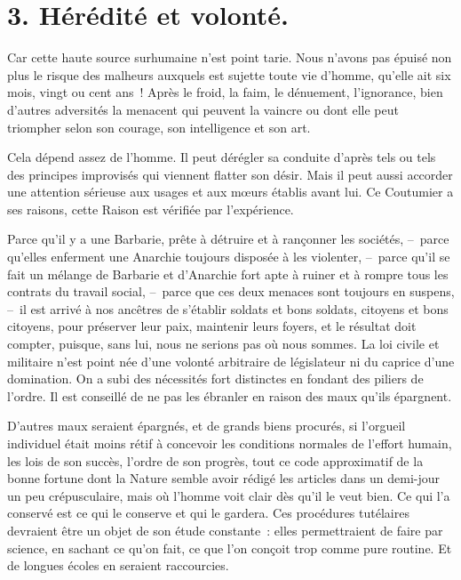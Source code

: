 \documentclass[french,twoside]{book} %
\begin{document}
\section[{3. Hérédité et volonté.}]{3. Hérédité et volonté.}
\noindent Car cette haute source surhumaine n’est point tarie. Nous n’avons pas épuisé non plus le risque des malheurs auxquels est sujette toute vie d’homme, qu’elle ait six mois, vingt ou cent ans ! Après le froid, la faim, le dénuement, l’ignorance, bien d’autres adversités la menacent qui peuvent la vaincre ou dont elle peut triompher selon son courage, son intelligence et son art.\par
Cela dépend assez de l’homme. Il peut dérégler sa conduite d’après tels ou tels des principes improvisés qui viennent flatter son désir. Mais il peut aussi accorder une attention sérieuse aux usages et aux mœurs établis avant lui. Ce Coutumier a ses raisons, cette Raison est vérifiée par l’expérience.\par
Parce qu’il y a une Barbarie, prête à détruire et à rançonner les sociétés, – parce qu’elles enferment une Anarchie toujours disposée à les violenter, – parce qu’il se fait un mélange de Barbarie et d’Anarchie fort apte à ruiner et à rompre tous les contrats du travail social, – parce que ces deux menaces sont toujours en suspens, – il est arrivé à nos ancêtres de s’établir soldats et bons soldats, citoyens et bons citoyens, pour préserver leur paix, maintenir leurs foyers, et le résultat doit compter, puisque, sans lui, nous ne serions pas où nous sommes. La loi civile et militaire n’est point née d’une volonté arbitraire de législateur ni du caprice d’une domination. On a subi des nécessités fort distinctes en fondant des piliers de l’ordre. Il est conseillé de ne pas les ébranler en raison des maux qu’ils épargnent.\par
D’autres maux seraient épargnés, et de grands biens procurés, si l’orgueil individuel était moins rétif à concevoir les conditions normales de l’effort humain, les lois de son succès, l’ordre de son progrès, tout ce code approximatif de la bonne fortune dont la Nature semble avoir rédigé les articles dans un demi-jour un peu crépusculaire, mais où l’homme voit clair dès qu’il le veut bien. Ce qui l’a conservé est ce qui le conserve et qui le gardera. Ces procédures tutélaires devraient être un objet de son étude constante : elles permettraient de faire par science, en sachant ce qu’on fait, ce que l’on conçoit trop comme pure routine. Et de longues écoles en seraient raccourcies.\par
\end{document}
